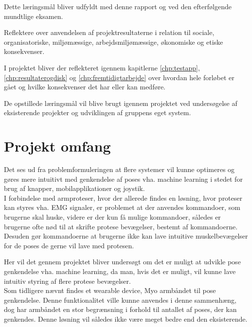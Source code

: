 \begin{myItemize}
	\begin{myItemize}
		\item Dette læringsmål bliver udfyldt med denne rapport og ved den efterfølgende mundtlige eksamen.
	\end{myItemize}
	\item Reflektere over anvendelsen af projektresultaterne i relation til sociale, organisatoriske, miljømæssige, arbejdsmiljømæssige, økonomiske og etiske konsekvenser.
	\begin{myItemize}
		\item I projektet bliver der reflekteret igennem kapitlerne \ref{chp:testapp}, \ref{chp:resultaterogdisk} og \ref{chp:fremtidigtarbejde} over hvordan hele forløbet er gået og hvilke konsekvenser det har eller kan medføre.
	\end{myItemize}
\end{myItemize}

De opstillede læringsmål vil blive brugt igennem projektet ved undersøgelse af eksisterende projekter og udviklingen af gruppens eget system.\\


\section{Projekt omfang}
Det ses ud fra problemformuleringen at flere systemer vil kunne optimeres og gøres mere intuitivt med genkendelse af poses vha. machine learning i stedet for brug af knapper, mobilapplikationer og joystik. \\

I forbindelse med armproteser, hvor der allerede findes en løsning, hvor proteser kan styres vha. EMG signaler, er problemet at der anvendes kommandoer, som brugerne skal huske, videre er der kun få mulige kommandoer, således er brugerne ofte nød til at skrifte protese bevægelser, bestemt af kommandoerne. Desuden gør kommandoerne at brugerne ikke kan lave intuitive muskelbevægelser for de poses de gerne vil lave med protesen. 

Her vil det gennem projektet bliver undersøgt om det er muligt at udvikle pose genkendelse vha. machine learning, da man, hvis det er muligt, vil kunne lave intuitiv styring af flere protese bevægelser. \\
Som tidligere nævnt findes et wearable device, Myo armbåndet til pose genkendelse. Denne funktionalitet ville kunne anvendes i denne sammenhæng, dog har armbåndet en stor begrænsning i forhold til antallet af poses, der kan genkendes. Denne løsning vil således ikke være meget bedre end den eksisterende.\\

